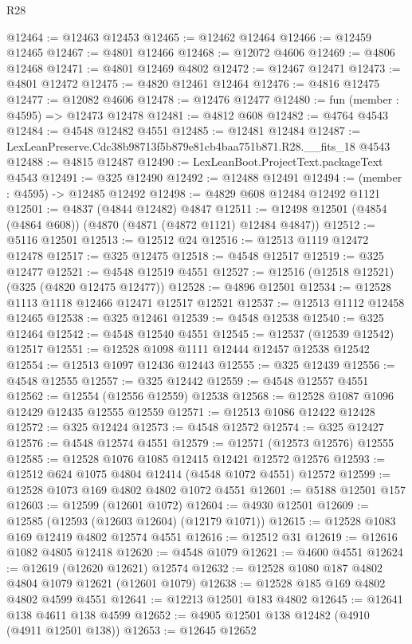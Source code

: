 \begin{lexlean}{R28}
\begin{coremodule}
@12464 := @12463 @12453
@12465 := @12462 @12464
@12466 := @12459 @12465
@12467 := @4801 @12466
@12468 := @12072 @4606
@12469 := @4806 @12468
@12471 := @4801 @12469 @4802
@12472 := @12467 @12471
@12473 := @4801 @12472
@12475 := @4820 @12461 @12464
@12476 := @4816 @12475
@12477 := @12082 @4606
@12478 := @12476 @12477
@12480 := fun (member : @4595) => @12473 @12478
@12481 := @4812 @608
@12482 := @4764 @4543
@12484 := @4548 @12482 @4551
@12485 := @12481 @12484
@12487 := LexLeanPreserve.Cdc38b98713f5b879e81cb4baa751b871.R28.__fits_18 @4543
@12488 := @4815 @12487
@12490 := LexLeanBoot.ProjectText.packageText @4543
@12491 := @325 @12490
@12492 := @12488 @12491
@12494 := (member : @4595) -> @12485 @12492
@12498 := @4829 @608 @12484 @12492 @1121
@12501 := @4837 (@4844 @12482) @4847
@12511 := @12498 @12501 (@4854 (@4864 @608)) (@4870 (@4871 (@4872 @1121) @12484 @4847))
@12512 := @5116 @12501
@12513 := @12512 @24
@12516 := @12513 @1119 @12472 @12478
@12517 := @325 @12475
@12518 := @4548 @12517
@12519 := @325 @12477
@12521 := @4548 @12519 @4551
@12527 := @12516 (@12518 @12521) (@325 (@4820 @12475 @12477))
@12528 := @4896 @12501
@12534 := @12528 @1113 @1118 @12466 @12471 @12517 @12521
@12537 := @12513 @1112 @12458 @12465
@12538 := @325 @12461
@12539 := @4548 @12538
@12540 := @325 @12464
@12542 := @4548 @12540 @4551
@12545 := @12537 (@12539 @12542) @12517
@12551 := @12528 @1098 @1111 @12444 @12457 @12538 @12542
@12554 := @12513 @1097 @12436 @12443
@12555 := @325 @12439
@12556 := @4548 @12555
@12557 := @325 @12442
@12559 := @4548 @12557 @4551
@12562 := @12554 (@12556 @12559) @12538
@12568 := @12528 @1087 @1096 @12429 @12435 @12555 @12559
@12571 := @12513 @1086 @12422 @12428
@12572 := @325 @12424
@12573 := @4548 @12572
@12574 := @325 @12427
@12576 := @4548 @12574 @4551
@12579 := @12571 (@12573 @12576) @12555
@12585 := @12528 @1076 @1085 @12415 @12421 @12572 @12576
@12593 := @12512 @624 @1075 @4804 @12414 (@4548 @1072 @4551) @12572
@12599 := @12528 @1073 @169 @4802 @4802 @1072 @4551
@12601 := @5188 @12501 @157
@12603 := @12599 (@12601 @1072)
@12604 := @4930 @12501
@12609 := @12585 (@12593 (@12603 @12604) (@12179 @1071))
@12615 := @12528 @1083 @169 @12419 @4802 @12574 @4551
@12616 := @12512 @31
@12619 := @12616 @1082 @4805 @12418
@12620 := @4548 @1079
@12621 := @4600 @4551
@12624 := @12619 (@12620 @12621) @12574
@12632 := @12528 @1080 @187 @4802 @4804 @1079 @12621 (@12601 @1079)
@12638 := @12528 @185 @169 @4802 @4802 @4599 @4551
@12641 := @12213 @12501 @183 @4802
@12645 := @12641 @138 @4611 @138 @4599
@12652 := @4905 @12501 @138 @12482 (@4910 (@4911 @12501 @138))
@12653 := @12645 @12652

\end{coremodule}
\end{lexlean}
